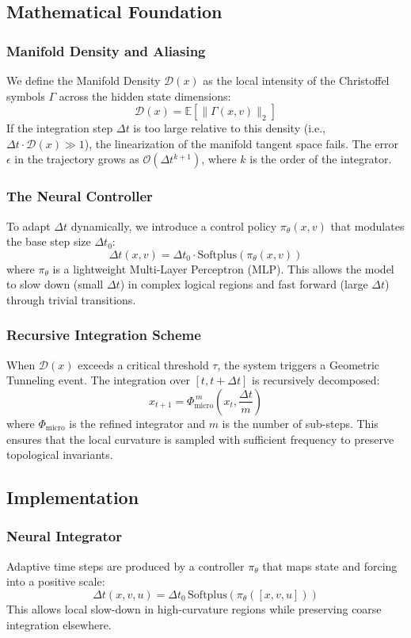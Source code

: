 \documentclass{article}
\numberwithin{equation}{section}
\begin{document}
\subsection{Mathematical Foundation}
\subsubsection{Manifold Density and Aliasing}
We define the Manifold Density $\mathcal{D}(x)$ as the local intensity of the Christoffel symbols $\Gamma$ across the hidden state dimensions:
\[
\mathcal{D}(x) = \mathbb{E} [ \| \Gamma(x, v) \|_2 ]
\]
If the integration step $\Delta t$ is too large relative to this density (i.e., $\Delta t \cdot \mathcal{D}(x) \gg 1$), the linearization of the manifold tangent space fails. The error $\epsilon$ in the trajectory grows as $\mathcal{O}(\Delta t^{k+1})$, where $k$ is the order of the integrator.

\subsubsection{The Neural Controller}
To adapt $\Delta t$ dynamically, we introduce a control policy $\pi_\theta(x, v)$ that modulates the base step size $\Delta t_0$:
\[
\Delta t(x, v) = \Delta t_0 \cdot \text{Softplus}\left( \pi_\theta(x, v) \right)
\]
where $\pi_\theta$ is a lightweight Multi-Layer Perceptron (MLP). This allows the model to slow down (small $\Delta t$) in complex logical regions and fast forward (large $\Delta t$) through trivial transitions.

\subsubsection{Recursive Integration Scheme}
When $\mathcal{D}(x)$ exceeds a critical threshold $\tau$, the system triggers a Geometric Tunneling event. The integration over $[t, t+\Delta t]$ is recursively decomposed:
\[
x_{t+1} = \Phi_{\text{micro}}^{\, m} \left( x_t, \frac{\Delta t}{m} \right)
\]
where $\Phi_{\text{micro}}$ is the refined integrator and $m$ is the number of sub-steps. This ensures that the local curvature is sampled with sufficient frequency to preserve topological invariants.

\subsection{Implementation}
\subsubsection{Neural Integrator}
Adaptive time steps are produced by a controller $\pi_\theta$ that maps state and forcing into a positive scale:
\[
\Delta t(x,v,u)=\Delta t_0\,\text{Softplus}\left(\pi_\theta([x,v,u])\right)
\]
This allows local slow-down in high-curvature regions while preserving coarse integration elsewhere.
\end{document}
